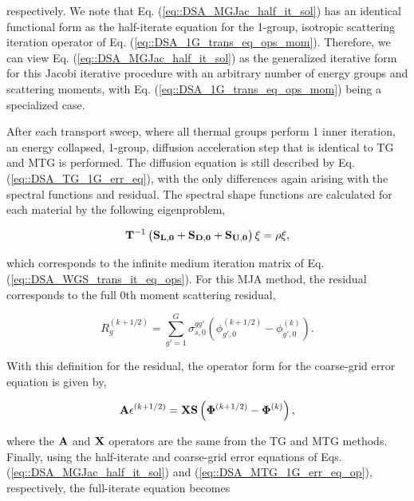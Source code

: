 \noindent respectively. We note that Eq. (\ref{eq::DSA_MGJac_half_it_sol}) has an identical functional form as the half-iterate equation for the 1-group, isotropic scattering iteration operator of Eq. (\ref{eq::DSA_1G_trans_eq_ops_mom}). Therefore, we can view Eq. (\ref{eq::DSA_MGJac_half_it_sol}) as the generalized iterative form for this Jacobi iterative procedure with an arbitrary number of energy groups and scattering moments, with Eq. (\ref{eq::DSA_1G_trans_eq_ops_mom}) being a specialized case.

After each transport sweep, where all thermal groups perform 1 inner iteration, an energy collapsed, 1-group, diffusion acceleration step that is identical to TG and MTG is performed. The diffusion equation is still described by Eq. (\ref{eq::DSA_TG_1G_err_eq}), with the only differences again arising with the spectral functions and residual. The spectral shape functions are calculated for each material by the following eigenproblem,

\begin{equation}
\label{eq::DSA_WGS_eigenpprob}
{\bf T}^{-1} \left( {\bf S_{L,0}} + {\bf S_{D,0}}+ {\bf S_{U,0}} \right)\xi = \rho \xi ,
\end{equation}

\noindent which corresponds to the infinite medium iteration matrix of Eq. (\ref{eq::DSA_WGS_trans_it_eq_ops}). For this MJA method, the residual corresponds to the full 0th moment scattering residual,


\begin{equation}
\label{eq::DSA_WGS_diff_residual}
R_g^{(k+1/2)} = \sum_{g'=1}^G \sigma_{s,0}^{g g'} \left( \phi_{g',0}^{(k+1/2)} - \phi_{g',0}^{(k)} \right) .
\end{equation}

\noindent With this definition for the residual, the operator form for the coarse-grid error equation is given by,

\begin{equation}
\label{eq::DSA_MTG_1G_err_eq_op}
{\bf A} \epsilon^{(k+1/2)}  =  {\bf X} {\bf S} \left(  {\bf \Phi}^{(k+1/2)} - {\bf \Phi}^{(k)}  \right),
\end{equation}

\noindent where the ${\bf A}$ and ${\bf X}$ operators are the same from the TG and MTG methods. Finally, using the half-iterate and coarse-grid error equations of Eqs. (\ref{eq::DSA_MGJac_half_it_sol}) and (\ref{eq::DSA_MTG_1G_err_eq_op}), respectively, the full-iterate equation becomes 

